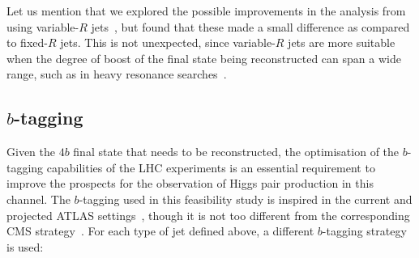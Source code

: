 Let us mention that we explored the possible improvements
in the analysis from using variable-$R$ jets~\cite{Krohn:2009zg}, but found that these made
a small difference as compared to fixed-$R$ jets.
%
This is not unexpected, since variable-$R$ jets are more suitable when
the degree of boost of the final state being reconstructed can span
a wide range, such as in heavy resonance searches~\cite{Aad:2015fna}.


\subsection{$b$-tagging}

Given the $4b$ final state that needs to be reconstructed, the
optimisation of the $b$-tagging capabilities of the
LHC experiments is an essential requirement to improve
the prospects for the observation of Higgs pair production in this channel.
%
The $b$-tagging used in this feasibility study is inspired
in the current and projected ATLAS settings~\cite{Aad:2013gja},
though
it is not too different from
 the corresponding CMS strategy~\cite{Khachatryan:2011wq,Chatrchyan:2012jua}.
%
For each type of jet defined above, a different
$b$-tagging strategy is used:

